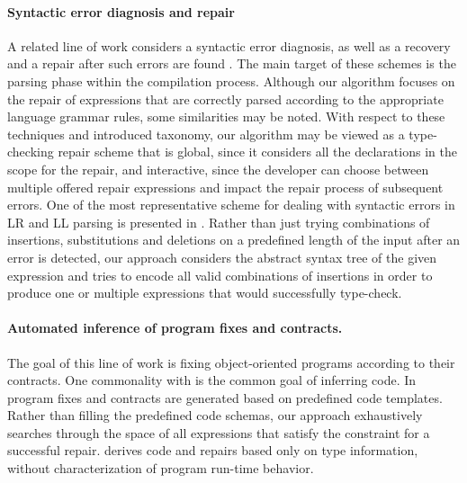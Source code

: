 \paragraph{{\bf Syntactic error diagnosis and repair}}
A related line of work considers a syntactic error diagnosis, as well as a recovery and a repair after such errors are found \cite{Hammond198451,Degano:1998:LTH:2245729.2245835}.
The main target of these schemes is the parsing phase within the compilation process. 
Although our algorithm focuses on the repair of expressions that are correctly parsed
according to the appropriate language grammar rules, some similarities may be noted.
With respect to these techniques and introduced taxonomy, our algorithm may be viewed
as a type-checking repair scheme that is global, since it considers all the declarations
in the scope for the repair, and interactive, since the developer can choose between multiple
offered repair expressions and impact the repair process of subsequent errors. 
One of the most representative scheme for dealing with syntactic errors in LR and LL
parsing is presented in \cite{Burke87apractical}.
Rather than just trying combinations of insertions, substitutions and deletions
on a predefined length of the input after an error is detected, our approach
considers the abstract syntax tree of the given expression and tries to encode all valid combinations of insertions in order to produce one
or multiple expressions that would successfully type-check.

\paragraph{{\bf Automated inference of program fixes and contracts.}}
The goal of this line of work
\cite{WeiETAL11InferringBetterContracts,PeiETAL11CodebasedAutomatedProgramFixing} is fixing
object-oriented programs according to their
contracts. One commonality with \ourTool is the common goal of inferring code. 
In \cite{WeiETAL11InferringBetterContracts,PeiETAL11CodebasedAutomatedProgramFixing} program fixes and contracts are generated based on predefined code templates. Rather than filling 
the predefined code schemas,
our approach exhaustively searches through the space of all expressions that
satisfy the constraint for a successful repair.
\ourTool derives code and repairs based only on type information, without characterization of program run-time
behavior.

